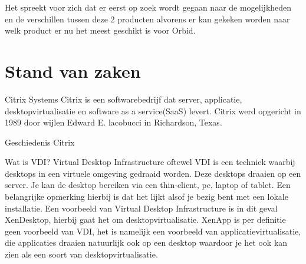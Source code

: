 Het spreekt voor zich dat er eerst op zoek wordt gegaan naar de mogelijkheden en de verschillen tussen deze 2 producten alvorens er kan gekeken worden naar welk product er nu het meest geschikt is voor Orbid.




\section{Stand van zaken}
\label{sec:stand-van-zaken}


Citrix Systems
Citrix is een softwarebedrijf dat server, applicatie, desktopvirtualisatie en software as a service(SaaS) levert. Citrix werd opgericht in 1989 door wijlen Edward E. lacobucci in Richardson, Texas.

Geschiedenis Citrix




Wat is VDI?
Virtual Desktop Infrastructure oftewel VDI is een techniek waarbij desktops in een virtuele omgeving gedraaid worden. Deze desktops draaien op een server. Je kan de desktop bereiken via een thin-client, pc, laptop of tablet. Een belangrijke opmerking hierbij is dat het lijkt alsof je bezig bent met een lokale installatie. Een voorbeeld van Virtual Desktop Infrastructure is in dit geval XenDesktop, hierbij gaat het om desktopvirtualisatie. XenApp is per definitie geen voorbeeld van VDI, het is namelijk een voorbeeld van applicatievirtualisatie, die applicaties draaien natuurlijk ook op een desktop waardoor je het ook kan zien als een soort van desktopvirtualisatie.

